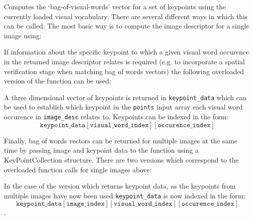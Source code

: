 Computes the `bag-of-visual-words' vector for a set of keypoints using the currently loaded visual vocabulary. There are several different ways in which this can be called. The most basic way is to compute the image descriptor for a single image using:

\begin{description}
\end{description}

If information about the specific keypoint to which a given visual word occurence in the returned image descriptor relates is required (e.g. to incorporate a spatial verification stage when matching bag of words vectors) the following overloaded version of the function can be used:

A three dimensional vector of keypoints is returned in \texttt{keypoint\_data} which can be used to establish which keypoint in the \texttt{points} input array each visual word occurence in \texttt{image\_desc} relates to. Keypoints can be indexed in the form:
\[
\texttt{keypoint\_data}[\texttt{visual\_word\_index}][\texttt{occurence\_index}]
\]

Finally, bag of words vectors can be returned for multiple images at the same time by passing image and keypoint data to the function using a KeyPointCollection structure. There are two versions which correspond to the overloaded function calls for single images above:


In the case of the version which returns keypoint data, as the keypoints from multiple images have now been used \texttt{keypoint\_data} is now indexed in the form:
\[
\texttt{keypoint\_data}[\texttt{image\_index}][\texttt{visual\_word\_index}][\texttt{occurence\_index}]
\].


